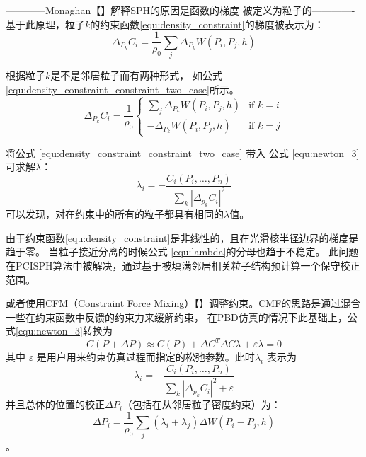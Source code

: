 ------------Monaghan【】解释SPH的原因是函数的梯度 被定义为粒子的-------------
基于此原理，粒子$k$的约束函数\ref{equ:density_constraint}的梯度被表示为：
\begin{equation}
\label{equ:density_constraint_constraint}
\Delta_{P_k}C_i = \frac{1}{\rho_0}\sum_j\Delta_{P_k}W(P_i,P_j,h)
\end{equation}

根据粒子$k$是不是邻居粒子而有两种形式，
如公式\ref{equ:density_constraint_constraint_two_case}所示。
\begin{equation}
\label{equ:density_constraint_constraint_two_case}
\Delta_{P_k}C_i = \frac{1}{\rho_0}\left\{
\begin{array}{ll}
\sum_j\Delta_{P_k}W(P_i,P_j,h)  & \text{if } k = i \\
{-}\Delta_{P_k}W(P_i,P_j,h)  & \text{if } k = j
\end{array} \right.
\end{equation}

将公式 \ref{equ:density_constraint_constraint_two_case} 带入
公式 \ref{equ:newton_3} 可求解$\lambda$：
\begin{equation}
\label{equ:lambda}
\lambda_i = {-}\frac{C_i(P_i,\dots,P_n)}{\sum_k|\Delta_{p_k}C_i|^2}
\end{equation}
可以发现，对在约束中的所有的粒子都具有相同的$\lambda$值。

由于约束函数\ref{equ:density_constraint}是非线性的，且在光滑核半径边界的梯度是趋于零。
当粒子接近分离的时候公式 \ref{equ:lambda}的分母也趋于不稳定。
此问题在PCISPH算法中被解决，通过基于被填满邻居相关粒子结构预计算一个保守校正范围。

或者使用CFM（Constraint Force Mixing）【】调整约束。CMF的思路是通过混合一些在约束函数中反馈的约束力来缓解约束，
在PBD仿真的情况下此基础上，公式\ref{equ:newton_3}转换为
\begin{equation}
\label{equ:constrain_with_cfm}
C(P+\Delta{}P)   \approx  C(P) + \Delta{}C^T\Delta{}C\lambda  + \varepsilon\lambda= 0
\end{equation}
其中 $\varepsilon$ 是用户用来约束仿真过程而指定的松弛参数。此时$\lambda_i$ 表示为
\begin{equation}
\label{equ:lambda_with_cfm}
\lambda_i = {-}\frac{C_i(P_i,\dots,P_n)}{\sum_k|\Delta_{p_k}C_i|^2 + \varepsilon}
\end{equation}
并且总体的位置的校正$\Delta{}P_i$（包括在从邻居粒子密度约束）为：
\begin{equation}
\label{equ:total_position_updade}
\Delta{}P_i = \frac{1}{\rho_0}\sum_j(\lambda_i+\lambda_j)\Delta{}W(P_i-P_j,h)
\end{equation}
。














